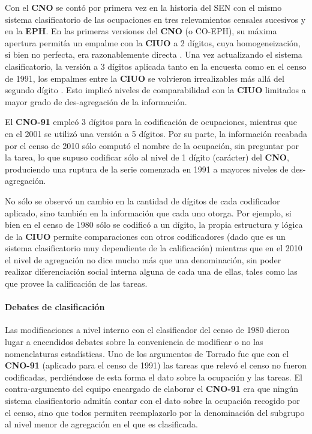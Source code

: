 \documentclass[
]{book}
\begin{document}
Con el \textbf{CNO} se contó por primera vez en la historia del SEN con el mismo sistema clasificatorio de las ocupaciones en tres relevamientos censales sucesivos y en la \textbf{EPH}. En las primeras versiones del \textbf{CNO} (o CO-EPH), su máxima apertura permitía un empalme con la \textbf{CIUO} a 2 dígitos, cuya homogeneización, si bien no perfecta, era razonablemente directa \citep{INDEC2000}. Una vez actualizando el sistema clasificatorio, la versión a 3 dígitos aplicada tanto en la encuesta como en el censo de 1991, los empalmes entre la \textbf{CIUO} se volvieron irrealizables más allá del segundo dígito \citep{INDEC1998}. Esto implicó niveles de comparabilidad con la \textbf{CIUO} limitados a mayor grado de des-agregación de la información.

El \textbf{CNO-91} empleó 3 dígitos para la codificación de ocupaciones, mientras que en el 2001 se utilizó una versión a 5 dígitos. Por su parte, la información recabada por el censo de 2010 sólo computó el nombre de la ocupación, sin preguntar por la tarea, lo que supuso codificar sólo al nivel de 1 dígito (carácter) del \textbf{CNO}, produciendo una ruptura de la serie comenzada en 1991 a mayores niveles de des-agregación.

No sólo se observó un cambio en la cantidad de dígitos de cada codificador aplicado, sino también en la información que cada uno otorga. Por ejemplo, si bien en el censo de 1980 sólo se codificó a un dígito, la propia estructura y lógica de la \textbf{CIUO} permite comparaciones con otros codificadores (dado que es un sistema clasificatorio muy dependiente de la calificación) mientras que en el 2010 el nivel de agregación no dice mucho más que una denominación, sin poder realizar diferenciación social interna alguna de cada una de ellas, tales como las que provee la calificación de las tareas.

\hypertarget{debates-de-clasificaciuxf3n}{%
\paragraph{Debates de clasificación}\label{debates-de-clasificaciuxf3n}}

Las modificaciones a nivel interno con el clasificador del censo de 1980 dieron lugar a encendidos debates sobre la conveniencia de modificar o no las nomenclaturas estadísticas. Uno de los argumentos de Torrado \citeyearpar{Torrado1993a} fue que con el \textbf{CNO-91} (aplicado para el censo de 1991) las tareas que relevó el censo no fueron codificadas, perdiéndose de esta forma el dato sobre la ocupación y las tareas. El contra-argumento del equipo encargado de elaborar el \textbf{CNO-91} \citep{Elizalde1993} era que ningún sistema clasificatorio admitía contar con el dato sobre la ocupación recogido por el censo, sino que todos permiten reemplazarlo por la denominación del subgrupo al nivel menor de agregación en el que es clasificada.
\end{document}
